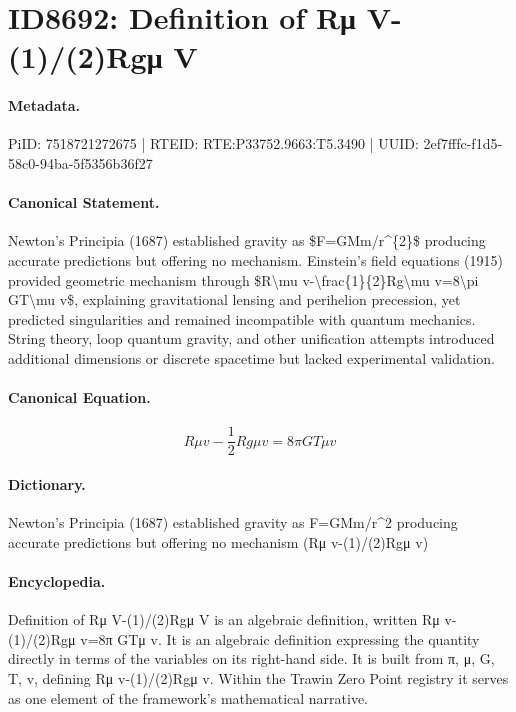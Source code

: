 \section*{ID8692: Definition of Rμ V-(1)/(2)Rgμ V}
\paragraph{Metadata.}
PiID: 7518721272675 | RTEID: RTE:P33752.9663:T5.3490 | UUID: 2ef7fffc-f1d5-58c0-94ba-5f5356b36f27

\paragraph{Canonical Statement.}
Newton's Principia (1687) established gravity as \$F=GMm/r\textasciicircum{}\{2\}\$ producing accurate predictions but offering no mechanism. Einstein's field equations (1915) provided geometric mechanism through \$R\textbackslash{}mu v-\textbackslash{}frac\{1\}\{2\}Rg\textbackslash{}mu v=8\textbackslash{}pi GT\textbackslash{}mu v\$, explaining gravitational lensing and perihelion precession, yet predicted singularities and remained incompatible with quantum mechanics. String theory, loop quantum gravity, and other unification attempts introduced additional dimensions or discrete spacetime but lacked experimental validation.

\paragraph{Canonical Equation.}
\[
R\mu v-\frac{1}{2}Rg\mu v=8\pi GT\mu v
\]

\paragraph{Dictionary.}
Newton's Principia (1687) established gravity as F=GMm/r\textasciicircum{}2 producing accurate predictions but offering no mechanism (Rμ v-(1)/(2)Rgμ v)

\paragraph{Encyclopedia.}
Definition of Rμ V-(1)/(2)Rgμ V is an algebraic definition, written Rμ v-(1)/(2)Rgμ v=8π GTμ v. It is an algebraic definition expressing the quantity directly in terms of the variables on its right-hand side. It is built from π, μ, G, T, v, defining Rμ v-(1)/(2)Rgμ v. Within the Trawin Zero Point registry it serves as one element of the framework's mathematical narrative.
